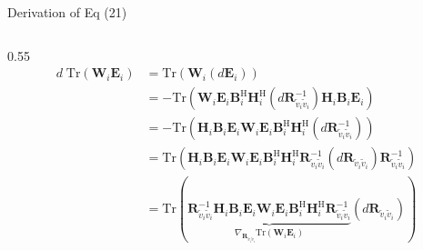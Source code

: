 \documentclass[aspectratio=169, 10pt]{beamer}
\begin{document}
\begin{frame}[label=app-wmmse-grad2]{Derivation of Eq (21)}
\begin{columns}
        \hspace{-20pt}
        \begin{column}{0.55\paperwidth}
            \begin{align*}
                d\;\mathrm{Tr}\left(\mathbf{W}_i \mathbf{E}_i\right)
                 & = \mathrm{Tr}\left(\mathbf{W}_i \left(d\mathbf{E}_i\right)\right)                                                                                                                                                                                                                                                                                                                          \\
                 & = -\mathrm{Tr}\left(\mathbf{W}_i \mathbf{E}_i \mathbf{B}_i^{\mathrm{H}} \mathbf{H}_i^{\mathrm{H}} \left(d\mathbf{R}_{\tilde{v}_i \tilde{v}_i}^{-1}\right) \mathbf{H}_i \mathbf{B}_i \mathbf{E}_i\right)                                                                                                                                                                                    \\
                 & = -\mathrm{Tr}\left( \mathbf{H}_i \mathbf{B}_i \mathbf{E}_i\mathbf{W}_i \mathbf{E}_i \mathbf{B}_i^{\mathrm{H}} \mathbf{H}_i^{\mathrm{H}} \left(d\mathbf{R}_{\tilde{v}_i \tilde{v}_i}^{-1}\right) \right)                                                                                                                                                                                   \\
                 & = \mathrm{Tr}\left( \mathbf{H}_i \mathbf{B}_i \mathbf{E}_i\mathbf{W}_i \mathbf{E}_i \mathbf{B}_i^{\mathrm{H}} \mathbf{H}_i^{\mathrm{H}} \mathbf{R}_{\tilde{v}_i \tilde{v}_i}^{-1}\left(d\mathbf{R}_{\tilde{v}_i \tilde{v}_i}\right)\mathbf{R}_{\tilde{v}_i \tilde{v}_i}^{-1} \right)                                                                                                       \\
                 & = \mathrm{Tr}\left( \underbrace{\mathbf{R}_{\tilde{v}_i \tilde{v}_i}^{-1} \mathbf{H}_i \mathbf{B}_i \mathbf{E}_i\mathbf{W}_i \mathbf{E}_i \mathbf{B}_i^{\mathrm{H}} \mathbf{H}_i^{\mathrm{H}} \mathbf{R}_{\tilde{v}_i \tilde{v}_i}^{-1}}_{\nabla_{\mathbf{R}_{\tilde{v}_i \tilde{v}_i}} \mathrm{Tr}(\mathbf{W}_i \mathbf{E}_i)} \left(d\mathbf{R}_{\tilde{v}_i \tilde{v}_i}\right) \right)
            \end{align*}
        \end{column}
    \end{columns}
\end{frame}
\end{document}
